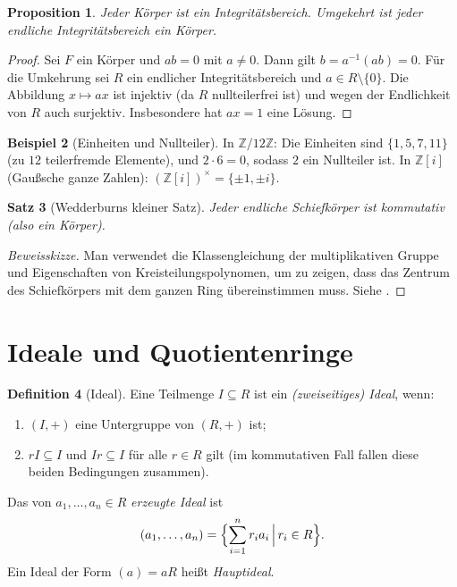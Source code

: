 \documentclass[12pt,a4paper]{amsart}
\newtheorem{theorem}{Satz}[section]
\newtheorem{proposition}[theorem]{Proposition}
\theoremstyle{definition}
\newtheorem{definition}[theorem]{Definition}
\newtheorem{example}[theorem]{Beispiel}
\theoremstyle{definition}
\begin{document}
\begin{proposition}\label{prop:koerper-int}
Jeder Körper ist ein Integritätsbereich. Umgekehrt ist jeder endliche Integritätsbereich
ein Körper.
\end{proposition}

\begin{proof}
Sei $F$ ein Körper und $ab = 0$ mit $a \neq 0$. Dann gilt $b = a^{-1}(ab) = 0$.
Für die Umkehrung sei $R$ ein endlicher Integritätsbereich und $a \in R \setminus \{0\}$.
Die Abbildung $x \mapsto ax$ ist injektiv (da $R$ nullteilerfrei ist) und wegen der
Endlichkeit von $R$ auch surjektiv. Insbesondere hat $ax = 1$ eine Lösung.
\end{proof}

\begin{example}[Einheiten und Nullteiler]
In $\mathbb{Z}/12\mathbb{Z}$: Die Einheiten sind $\{1,5,7,11\}$ (zu $12$ teilerfremde
Elemente), und $2 \cdot 6 = 0$, sodass $2$ ein Nullteiler ist.
In $\mathbb{Z}[i]$ (Gaußsche ganze Zahlen): $(\mathbb{Z}[i])^\times = \{\pm 1, \pm i\}$.
\end{example}

\begin{theorem}[Wedderburns kleiner Satz]
Jeder endliche Schiefkörper ist kommutativ (also ein Körper).
\end{theorem}

\begin{proof}[Beweissk{}izze]
Man verwendet die Klassengleichung der multiplikativen Gruppe und Eigenschaften
von Kreisteilungspolynomen, um zu zeigen, dass das Zentrum des Schiefkörpers
mit dem ganzen Ring übereinstimmen muss. Siehe \cite[Satz~13.1]{Lang2002}.
\end{proof}

\section{Ideale und Quotientenringe}

\begin{definition}[Ideal]
Eine Teilmenge $I \subseteq R$ ist ein \emph{(zweiseitiges) Ideal}, wenn:
\begin{enumerate}[label=(\roman*)]
  \item $(I,+)$ eine Untergruppe von $(R,+)$ ist;
  \item $rI \subseteq I$ und $Ir \subseteq I$ für alle $r \in R$ gilt
        (im kommutativen Fall fallen diese beiden Bedingungen zusammen).
\end{enumerate}
Das von $a_1,\ldots,a_n \in R$ \emph{erzeugte Ideal} ist
\[
  (a_1,\ldots,a_n) = \Bigl\{\sum_{i=1}^{n} r_i a_i \,\Big|\, r_i \in R\Bigr\}.
\]
Ein Ideal der Form $(a) = aR$ heißt \emph{Hauptideal}.
\end{definition}
\end{document}
